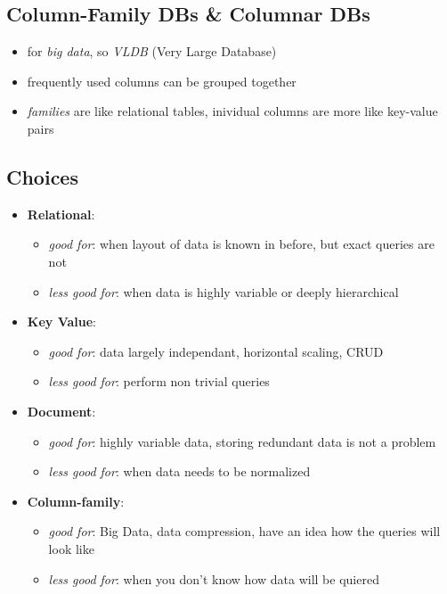 \documentclass[a4paper]{article}
\begin{document}
\begin{multicols}{3}
\subsection{Column-Family DBs \& Columnar DBs}
\begin{itemize}
    \item for \textit{big data}, so \textit{VLDB} (Very Large Database)
    \item frequently used columns can be grouped together
    \item \textit{families} are like relational tables, inividual columns are more like key-value pairs
\end{itemize}

\subsection{Choices}
\begin{itemize}
    \item \textbf{Relational}: 
        \begin{itemize}
            \item \textit{good for}: when layout of data is known in before, but exact queries are not
            \item \textit{less good for}: when data is highly variable or deeply hierarchical
        \end{itemize}
    \item \textbf{Key Value}: 
        \begin{itemize}
            \item \textit{good for}: data largely independant, horizontal scaling, CRUD
            \item \textit{less good for}: perform non trivial queries
        \end{itemize}
    \item \textbf{Document}: 
        \begin{itemize}
            \item \textit{good for}: highly variable data, storing redundant data is not a problem
            \item \textit{less good for}: when data needs to be normalized
        \end{itemize}
    \item \textbf{Column-family}: 
        \begin{itemize}
            \item \textit{good for}: Big Data, data compression, have an idea how the queries will look like
            \item \textit{less good for}: when you don't know how data will be quiered

\end{itemize}
\end{itemize}
\end{multicols}
\end{document}
